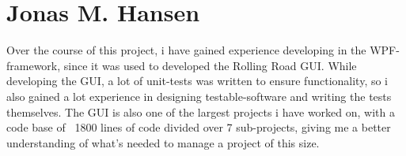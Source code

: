 \section{Jonas M. Hansen}
Over the course of this project, i have gained experience developing in the WPF-framework, since it was used to developed the Rolling Road GUI. While developing the GUI, a lot of unit-tests was written to ensure functionality, so i also gained a lot experience in designing testable-software and writing the tests themselves. The GUI is also one of the largest projects i have worked on, with a code base of ~1800 lines of code divided over 7 sub-projects, giving me a better understanding of what's needed to manage a project of this size.